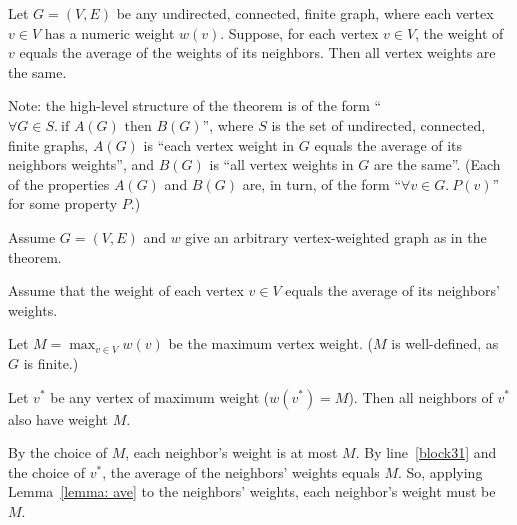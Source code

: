\documentclass[11pt]{article}
\begin{document}
\begin{problems}
  \begin{theorem}
    Let $G=(V,E)$ be any undirected, connected, finite graph,
    where each vertex $v\in V$ has a numeric weight $w(v)$.
    Suppose, for each vertex $v\in V$, the weight of $v$ equals
    the average of the weights of its neighbors.
    Then all vertex weights are the same.
  \end{theorem}

  \smallskip

  Note: the high-level structure of the theorem is of the form
  ``$\forall G\in S.~\text{if } A(G) \text{ then } B(G)$'',
  where $S$ is the set of undirected, connected, finite graphs,
  $A(G)$ is ``each vertex weight in $G$ equals the average of its neighbors weights'',
  and $B(G)$ is ``all vertex weights in $G$ are the same''.
  (Each of the properties $A(G)$ and $B(G)$ are, in turn,
  of the form ``$\forall v\in G.~P(v)$'' for some property $P$.)

  \begin{longFormProof}

    \begin{block}[block30]
      {Assume $G=(V,E)$ and $w$ give an arbitrary vertex-weighted graph as in the theorem.}

      \begin{block}[block31]
        {Assume that the weight of each vertex $v\in V$ 
        equals the average of its neighbors' weights.}

        \step Let $M = \max_{v\in V} w(v)$ be the maximum vertex weight.
        ($M$ is well-defined, as $G$ is finite.)

        \smallskip 
        \hrulefill
        \smallskip 

        \begin{lemma}
          Let $v^*$ be any vertex of maximum weight ($w(v^*)=M$).
          Then all neighbors of $v^*$ also have weight $M$.
        \end{lemma}

        \begin{longFormProof}
          \step By the choice of $M$, each neighbor's weight is at most $M$. 
          \step By line~\ref{block31} and the choice of $v^*$,
          the average of the neighbors' weights equals $M$.
          \step So, applying Lemma~\ref{lemma: ave} to the neighbors' weights,
          each neighbor's weight must be $M$.
        \end{longFormProof}


\end{block}
\end{block}
\end{longFormProof}
\end{problems}
\end{document}
